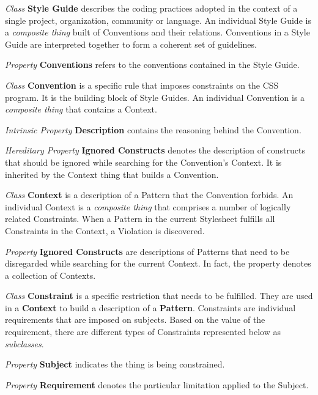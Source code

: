 \documentclass[parskip=full]{uvamscse}
\begin{document}
\begin{description}

\item\textit{Class} \textbf{Style Guide} describes the coding practices adopted in the context of a single project, organization, community or language. An individual Style Guide is a \textit{composite thing} built of Conventions and their relations. Conventions in a Style Guide are interpreted together to form a coherent set of guidelines.

\textit{Property} \textbf{Conventions} refers to the conventions contained in the Style Guide.


\item\textit{Class} \textbf{Convention} is a specific rule that imposes constraints on the CSS program. It is the building block of Style Guides. An individual Convention is a \textit{composite thing} that contains a Context.

\textit{Intrinsic Property} \textbf{Description} contains the reasoning behind the Convention.

\textit{Hereditary Property} \textbf{Ignored Constructs} denotes the description of constructs that should be ignored while searching for the Convention's Context. It is inherited by the Context thing that builds a Convention.


\item\textit{Class} \textbf{Context} is a description of a Pattern that the Convention forbids. An individual Context is a \textit{composite thing} that comprises a number of logically related Constraints. When a Pattern in the current Stylesheet fulfills all Constraints in the Context, a Violation is discovered.

\textit{Property} \textbf{Ignored Constructs} are descriptions of Patterns that need to be disregarded while searching for the current Context. In fact, the property denotes a collection of Contexts.


\item\textit{Class} \textbf{Constraint} is a specific restriction that needs to be fulfilled. They
are used in a \textbf{Context} to build a description of a \textbf{Pattern}. Constraints are
individual requirements that are imposed on subjects. Based on the value of the requirement, there
are different types of Constraints represented below as \textit{subclasses}.

\textit{Property} \textbf{Subject} indicates the thing is being constrained.

\textit{Property} \textbf{Requirement} denotes the particular limitation applied to the Subject.



\end{description}
\end{document}
